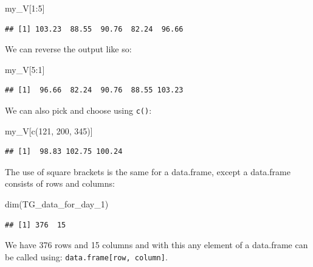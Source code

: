 \documentclass[
]{book}
\newenvironment{Shaded}{\begin{snugshade}}{\end{snugshade}}
\newcommand{\DecValTok}[1]{\textcolor[rgb]{0.00,0.00,0.81}{#1}}
\newcommand{\FunctionTok}[1]{\textcolor[rgb]{0.00,0.00,0.00}{#1}}
\newcommand{\NormalTok}[1]{#1}
\newcommand{\SpecialCharTok}[1]{\textcolor[rgb]{0.00,0.00,0.00}{#1}}
\begin{document}
\begin{Shaded}
\begin{Highlighting}[]
\NormalTok{my\_V[}\DecValTok{1}\SpecialCharTok{:}\DecValTok{5}\NormalTok{]}
\end{Highlighting}
\end{Shaded}

\begin{verbatim}
## [1] 103.23  88.55  90.76  82.24  96.66
\end{verbatim}

We can reverse the output like so:

\begin{Shaded}
\begin{Highlighting}[]
\NormalTok{my\_V[}\DecValTok{5}\SpecialCharTok{:}\DecValTok{1}\NormalTok{]}
\end{Highlighting}
\end{Shaded}

\begin{verbatim}
## [1]  96.66  82.24  90.76  88.55 103.23
\end{verbatim}

We can also pick and choose using \texttt{c()}:

\begin{Shaded}
\begin{Highlighting}[]
\NormalTok{my\_V[}\FunctionTok{c}\NormalTok{(}\DecValTok{121}\NormalTok{, }\DecValTok{200}\NormalTok{, }\DecValTok{345}\NormalTok{)]}
\end{Highlighting}
\end{Shaded}

\begin{verbatim}
## [1]  98.83 102.75 100.24
\end{verbatim}

The use of square brackets is the same for a data.frame, except a data.frame consists of rows and columns:

\begin{Shaded}
\begin{Highlighting}[]
\FunctionTok{dim}\NormalTok{(TG\_data\_for\_day\_1)}
\end{Highlighting}
\end{Shaded}

\begin{verbatim}
## [1] 376  15
\end{verbatim}

We have 376 rows and 15 columns and with this any element of a data.frame can be called using: \texttt{data.frame{[}row,\ column{]}}.
\end{document}
